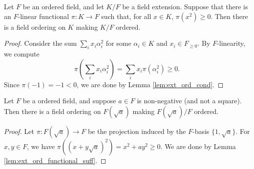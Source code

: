 \begin{lemma}
  \label{lem:ext_ord_functional_suff}
  \leanok
  Let $F$ be an ordered field, and let $K/F$ be a field extension. Suppose that there is an $F$-linear functional $\pi:K\to F$ such that, for all $x\in K$, $\pi(x^2)\geq0$. Then there is a field ordering on $K$ making $K/F$ ordered.
\end{lemma}
\begin{proof}
  \leanok
  Consider the sum $\sum_i x_i\alpha_i^2$ for some $\alpha_i\in K$ and $x_i\in F_{\geq0}$. By $F$-linearity, we compute
  \[\pi(\sum_i x_i\alpha_i^2)=\sum_i x_i\pi(\alpha_i^2)\geq0.\]
  Since $\pi(-1)=-1<0$, we are done by Lemma \ref{lem:ext_ord_cond}.
\end{proof}

\begin{corollary}
  \label{cor:ext_ord_to_adj_sqrt}
  \leanok
  Let $F$ be a ordered field, and suppose $a\in F$ is non-negative (and not a square). Then there is a field ordering on $F(\sqrt{a})$ making $F(\sqrt{a})/F$ ordered.
\end{corollary}
\begin{proof}
  \leanok
  Let $\pi:F(\sqrt{a})\to F$ be the projection induced by the $F$-basis $\{1,\sqrt{a}\}$. For $x,y\in F$, we have $\pi((x+y\sqrt{a})^2)=x^2+ay^2\geq0$. We are done by Lemma \ref{lem:ext_ord_functional_suff}.
\end{proof}

